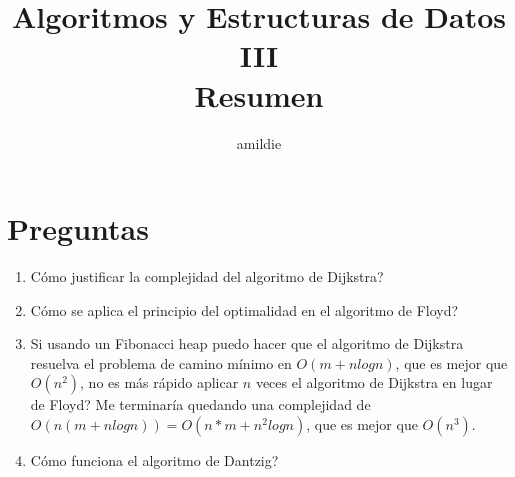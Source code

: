 \documentclass[10pt, a4paper]{article}
\title{Algoritmos y Estructuras de Datos III\\Resumen}
\author{amildie}
\date{\vspace{-5ex}}
\begin{document}
\renewcommand*\contentsname{\empty}

\maketitle
\tableofcontents















\newpage
\section{Preguntas}
\begin{enumerate}
\item C\'omo justificar la complejidad del algoritmo de Dijkstra?
\item C\'omo se aplica el principio del optimalidad en el algoritmo de Floyd?
\item Si usando un Fibonacci heap puedo hacer que el algoritmo de Dijkstra resuelva el problema de camino m\'inimo en $O(m + n log n)$, que es mejor que $O(n^2)$, no es m\'as r\'apido aplicar $n$ veces el algoritmo de Dijkstra en lugar de Floyd? Me terminar\'ia quedando una complejidad de $O(n(m + n log n)) = $$O(n*m + n^2 log n)$, que es mejor que $O(n^3)$.
\item C\'omo funciona el algoritmo de Dantzig?
\end{enumerate}
\end{document}
